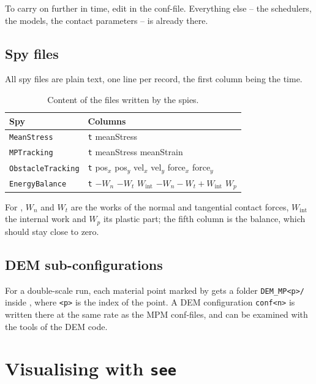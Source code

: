 \documentclass[a4paper,onecolumn,11pt]{doofus}
\begin{document}
To carry on further in time, edit  in the conf-file. Everything else -- the
schedulers, the models, the contact parameters -- is already there.

\subsection{Spy files}
\label{sec:spyfiles}

All spy files are plain text, one line per record, the first column being the time.

\begin{table}[H]
\centering
\begin{tabular}{ll}
\toprule
\textbf{Spy} & \textbf{Columns}\\
\midrule
\texttt{MeanStress}       & \texttt{t} \quad meanStress \\
\texttt{MPTracking}       & \texttt{t} \quad meanStress \quad meanStrain \\
\texttt{ObstacleTracking} & \texttt{t} \quad pos$_x$ pos$_y$ \quad vel$_x$ vel$_y$ \quad force$_x$ force$_y$ \\
\texttt{EnergyBalance}    & \texttt{t} \quad $-W_n$ \quad $-W_t$ \quad $W_{\text{int}}$ \quad $-W_n-W_t+W_{\text{int}}$ \quad $W_p$ \\
\bottomrule
\end{tabular}
\caption{Content of the files written by the spies.}
\label{tab:spycolumns}
\end{table}

For , $W_n$ and $W_t$ are the works of the normal and tangential contact
forces, $W_{\text{int}}$ the internal work and $W_p$ its plastic part; the fifth column is the
balance, which should stay close to zero.

\subsection{DEM sub-configurations}
\label{sec:demfiles}

For a double-scale run, each material point marked by  gets a
folder \texttt{DEM\_MP<p>/} inside , where \texttt{<p>} is the index of
the point. A DEM configuration \texttt{conf<n>} is written there at the same rate as the
MPM conf-files, and can be examined with the tools of the DEM code.


\section{Visualising with \texttt{see}}
\label{sec:see}
\end{document}
